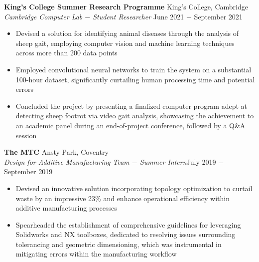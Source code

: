 \documentclass{article}
\begin{document}
\textbf{King's College Summer Research Programme} \hfill King's College, Cambridge \\
\textit{Cambridge Computer Lab $-$ Student Researcher} \hfill June 2021 $-$ September 2021
\begin{itemize}
    \item Devised a solution for identifying animal diseases through the analysis of sheep gait, employing computer vision and machine learning techniques across more than 200 data points
    \item Employed convolutional neural networks to train the system on a substantial 100-hour dataset, significantly curtailing human processing time and potential errors
    \item Concluded the project by presenting a finalized computer program adept at detecting sheep footrot via video gait analysis, showcasing the achievement to an academic panel during an end-of-project conference, followed by a Q\&A session
\end{itemize} \medskip

\textbf{The MTC} \hfill Ansty Park, Coventry \\
\textit{Design for Additive Manufacturing Team $-$ Summer Intern}\hfill July 2019 $-$ September 2019
\begin{itemize}
    \item Devised an innovative solution incorporating topology optimization to curtail waste by an impressive 23\% and enhance operational efficiency within additive manufacturing processes
    \item Spearheaded the establishment of comprehensive guidelines for leveraging Solidworks and NX toolboxes, dedicated to resolving issues surrounding tolerancing and geometric dimensioning, which was instrumental in mitigating errors within the manufacturing workflow
\end{itemize} \medskip
\end{document}
